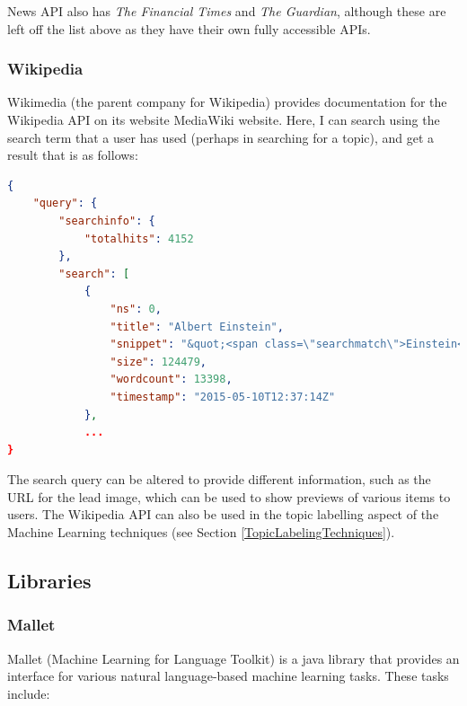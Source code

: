 \documentclass[12pt]{article}
\begin{document}
News API also has \emph{The Financial Times} and \emph{The Guardian}, although these are left off the list above as they have their own fully accessible APIs.  

\subsubsection{Wikipedia}

Wikimedia (the parent company for Wikipedia\cite{wikipedia}) provides documentation for the Wikipedia API on its website MediaWiki website. Here, I can search using the search term that a user has used (perhaps in searching for a topic), and get a result that is as follows:

\begin{lstlisting}[language=json, firstnumber=1]
{
    "query": {
        "searchinfo": {
            "totalhits": 4152
        },
        "search": [
            {
                "ns": 0,
                "title": "Albert Einstein",
                "snippet": "&quot;<span class=\"searchmatch\">Einstein</span>&quot; redirects here. For other uses, see <span class=\"searchmatch\">Albert</span> <span class=\"searchmatch\">Einstein</span> (disambiguation) and <span class=\"searchmatch\">Einstein</span> (disambiguation). <span class=\"searchmatch\">Albert</span> <span class=\"searchmatch\">Einstein</span> (/?alb?rt ?a?n?ta?n/; German:",
                "size": 124479,
                "wordcount": 13398,
                "timestamp": "2015-05-10T12:37:14Z"
            },
            ...
}
\end{lstlisting}

The search query can be altered to provide different information, such as the URL for the lead image, which can be used to show previews of various items to users. The Wikipedia API can also be used in the topic labelling aspect of the Machine Learning techniques (see Section \ref{TopicLabelingTechniques}).

\subsection{Libraries}

\subsubsection{Mallet}

Mallet (Machine Learning for Language Toolkit) is a java library that provides an interface for various natural language-based machine learning tasks. These tasks include:
\end{document}
